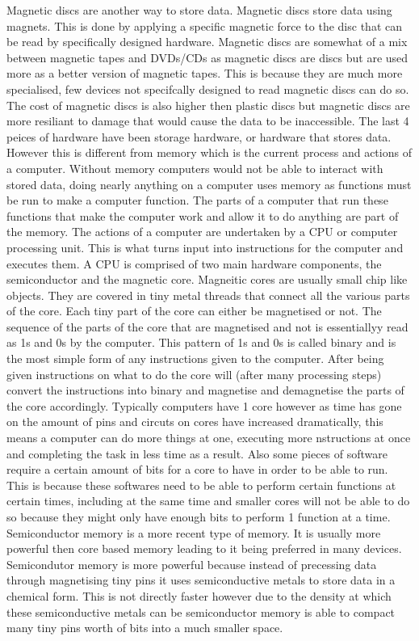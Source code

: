 \documentclass{article}
\begin{document}
Magnetic discs are another way to store data. Magnetic discs store data using magnets. This is done by applying a specific magnetic force to the disc that can be read by specifically designed hardware. Magnetic discs are somewhat of a mix between magnetic tapes and DVDs/CDs as magnetic discs are discs but are used more as a better version of magnetic tapes. This is because they are much more specialised, few devices not specifcally designed to read magnetic discs can do so. The cost of magnetic discs is also higher then plastic discs but magnetic discs are more resiliant to damage that would cause the data to be inaccessible.
The last 4 peices of hardware have been storage hardware, or hardware that stores data. However this is different from memory which is the current process and actions of a computer. Without memory computers would not be able to interact with stored data, doing nearly anything on a computer uses memory as functions must be run to make a computer function. The parts of a computer that run these functions that make the computer work and allow it to do anything are part of the memory. The actions of a computer are undertaken by a CPU or computer processing unit. This is what turns input into instructions for the computer and executes them. A CPU is comprised of two main hardware components, the semiconductor and the magnetic core.
Magneitic cores are usually small chip like objects. They are covered in tiny metal threads that connect all the various parts of the core. Each tiny part of the core can either be magnetised or not. The sequence of the parts of the core that are magnetised and not is essentiallyy read as 1s and 0s by the computer. This pattern of 1s and 0s is called binary and is the most simple form of any instructions given to the computer. After being given instructions on what to do the core will (after many processing steps) convert the instructions into binary and magnetise and demagnetise the parts of the core accordingly. Typically computers have 1 core however as time has gone on the amount of pins and circuts on cores have increased dramatically, this means a computer can do more things at one, executing more nstructions at once and completing the task in less time as a result. Also some pieces of software require a certain amount of bits for a core to have in order to be able to run. This is because these softwares need to be able to perform certain functions at certain times, including at the same time and smaller cores will not be able to do so because they might only have enough bits to perform 1 function at a time.
Semiconductor memory is a more recent type of memory. It is usually more powerful then core based memory leading to it being preferred in many devices. Semicondutor memory is more powerful because instead of precessing data through magnetising tiny pins it uses semiconductive metals to store data in a chemical form. This is not directly faster however due to the density at which these semiconductive metals can be semiconductor memory is able to compact many tiny pins worth of bits into a much smaller space.
\end{document}
